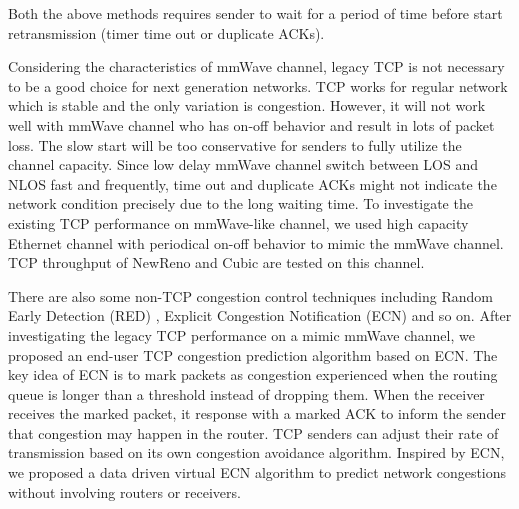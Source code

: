 Both the above methods requires sender to wait for a period of time before start retransmission (timer time out or duplicate ACKs). 
\par Considering the characteristics of mmWave channel, legacy TCP is not necessary to be a good choice for next generation networks. TCP works for regular network which is stable and the only variation is congestion. However, it will not work well with mmWave channel who has on-off behavior and result in lots of packet loss. The slow start will be too conservative for senders to fully utilize the channel capacity. Since low delay mmWave channel switch between LOS and NLOS fast and frequently, time out and duplicate ACKs might not indicate the network condition precisely due to the long waiting time. To investigate the existing TCP performance on mmWave-like channel, we used high capacity Ethernet channel with periodical on-off behavior to mimic the mmWave channel. TCP throughput of NewReno and Cubic \cite{grieco2004performance, ha2008cubic} are tested on this channel. 
\par There are also some non-TCP congestion control techniques including Random Early Detection (RED) \cite{lin1997dynamics}, Explicit Congestion Notification (ECN) \cite{ramakrishnan2001rfc} and so on. After investigating the legacy TCP performance on a mimic mmWave channel, we proposed an end-user TCP congestion prediction algorithm based on ECN. The key idea of ECN is to mark packets as congestion experienced when the routing queue is longer than a threshold instead of dropping them. When the receiver receives the marked packet, it response with a marked ACK to inform the sender that congestion may happen in the router. TCP senders can adjust their rate of transmission based on its own congestion avoidance algorithm. Inspired by ECN, we proposed a data driven virtual ECN algorithm to predict network congestions without involving routers or receivers.
